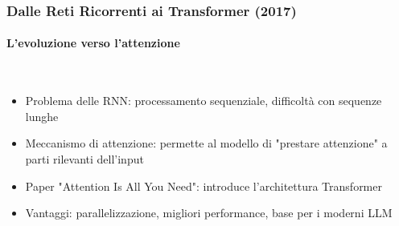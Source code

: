 %
\begin{frame}[t,fragile] \frametitle{Dalle Reti Ricorrenti ai Transformer (2017)}
	{\scriptsize
		\onslide<1->
            \framesubtitle{L'evoluzione verso l'attenzione}
            \vspace*{-15pt}
            \begin{minipage}[t]{\textwidth}
            \end{minipage}
            \\\vspace*{3pt}
	    	\begin{minipage}[t]{\textwidth}
				\begin{minipage}[t]{0.6\textwidth}
	    			\begin{itemize}[leftmargin=10pt,align=right]
						\onslide<2->\item[\alert{\faHandORight}] \alert{Problema delle RNN:} processamento sequenziale, difficoltà con sequenze lunghe
						\onslide<3->\item[\alert{\faHandORight}] \alert{Meccanismo di attenzione:} permette al modello di "prestare attenzione" a parti rilevanti dell'input
						\onslide<4->\item[\alert{\faHandORight}] \alert{Paper "Attention Is All You Need":} introduce l'architettura Transformer
						\onslide<5->\item[\alert{\faHandORight}] \alert{Vantaggi:} parallelizzazione, migliori performance, base per i moderni LLM
					\end{itemize}
            	\end{minipage}
            	\begin{minipage}[t]{0.4\textwidth}
            	\end{minipage}
	    	\end{minipage}
	}
\end{frame}
